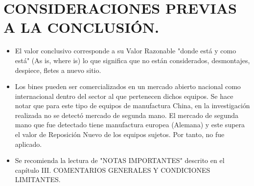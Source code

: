 
\chapter{CONSIDERACIONES PREVIAS A LA CONCLUSIÓN.} %
\begin{itemize}
	\item El valor conclusivo corresponde a su Valor Razonable "donde está y como está" (As is, where is) lo que significa que no están considerados, desmontajes, despiece, fletes a nuevo sitio.
	\item Los bines pueden ser comercializados en un mercado abierto nacional como internacional dentro del sector al que pertenecen dichos equipos.
		Se hace notar que para este tipo de equipos de manufactura China, en la investigación realizada no se detectó mercado de segunda mano.
		El mercado de segunda mano que fue detectado tiene manufactura europea (Alemana) y este supera el valor de Reposición Nuevo de los equipos sujetos.
		Por tanto, no fue aplicado.
	\item Se recomienda la lectura de "NOTAS IMPORTANTES" descrito en el capítulo III. COMENTARIOS GENERALES Y CONDICIONES LIMITANTES.
\end{itemize}
